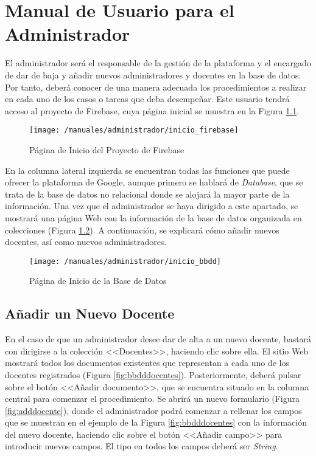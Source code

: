 \chapter{Manual de Usuario para el Administrador}
\label{chap:manadmin}

El administrador será el responsable de la gestión de la plataforma y el encargado de dar de baja y añadir nuevos administradores y docentes en la base de datos. Por tanto, deberá conocer de una manera adecuada los procedimientos a realizar en cada uno de los casos o tareas que deba desempeñar. Este usuario tendrá acceso al proyecto de Firebase, cuya página inicial se muestra en la Figura \ref{fig:maniniciofirebase}.

\begin{figure}[!h]
	\begin{center}
		\texttt{[image: /manuales/administrador/inicio\_firebase]}
		\caption{Página de Inicio del Proyecto de Firebase}
		\label{fig:maniniciofirebase}
	\end{center}
\end{figure}

\clearpage

En la columna lateral izquierda se encuentran todas las funciones que puede ofrecer la plataforma de Google, aunque primero se hablará de \textit{Database}, que se trata de la base de datos no relacional donde se alojará la mayor parte de la información. Una vez que el administrador se haya dirigido a este apartado, se mostrará una página Web con la información de la base de datos organizada en colecciones (Figura \ref{fig:iniciobbdd}). A continuación, se explicará cómo añadir nuevos docentes, así como nuevos administradores.

\begin{figure}[!h]
	\begin{center}
		\texttt{[image: /manuales/administrador/inicio\_bbdd]}
		\caption{Página de Inicio de la Base de Datos}
		\label{fig:iniciobbdd}
	\end{center}
\end{figure}

\clearpage

\section*{Añadir un Nuevo Docente}
En el caso de que un administrador desee dar de alta a un nuevo docente, bastará con dirigirse a la colección <<Docentes>>, haciendo clic sobre ella. El sitio Web mostrará todos los documentos existentes que representan a cada uno de los docentes registrados (Figura \ref{fig:bbdddocentes}). Posteriormente, deberá pulsar sobre el botón <<Añadir documento>>, que se encuentra situado en la columna central para comenzar el procedimiento. Se abrirá un nuevo formulario (Figura \ref{fig:adddocente}), donde el administrador podrá comenzar a rellenar los campos que se muestran en el ejemplo de la Figura \ref{fig:bbdddocentes} con la información del nuevo docente, haciendo clic sobre el botón <<Añadir campo>> para introducir nuevos campos. El tipo en todos los campos deberá ser \textit{String}.

